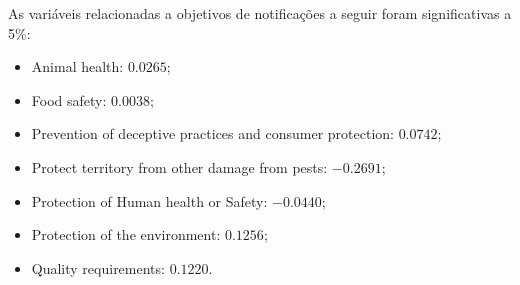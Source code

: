 As variáveis relacionadas a objetivos de notificações a seguir foram significativas a 5\%:
\begin{itemize}
    \item Animal health: $0.0265$;
    \item Food safety: $0.0038$;
    \item Prevention of deceptive practices and consumer protection: $0.0742$;
    \item Protect territory from other damage from pests: $-0.2691$;
    \item Protection of Human health or Safety: $-0.0440$;
    \item Protection of the environment: $0.1256$;
    \item Quality requirements: $0.1220$.
\end{itemize}
